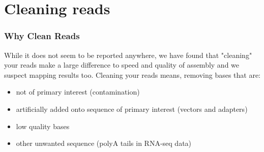 \documentclass[pdf]{beamer}
\begin{document}
\section{Cleaning reads}

\begin{frame}
\frametitle{Why Clean Reads}
While it does not seem to be reported anywhere, we have found that "cleaning" your reads make a large difference to speed and quality of assembly and we suspect mapping results too.
\vspace{0.2in}
Cleaning your reads means, removing bases that are:
\begin{itemize}
\item not of primary interest (contamination)
\item artificially added onto sequence of primary interest (vectors and adapters)
\item low quality bases
\item other unwanted sequence (polyA tails in RNA-seq data)
\end{itemize}

\end{frame}
\end{document}
